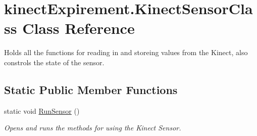 \hypertarget{classkinect_expirement_1_1_kinect_sensor_class}{}\section{kinect\+Expirement.\+Kinect\+Sensor\+Class Class Reference}
\label{classkinect_expirement_1_1_kinect_sensor_class}


Holds all the functions for reading in and storeing values from the Kinect, also constrols the state of the sensor.  


\subsection*{Static Public Member Functions}
\begin{DoxyCompactItemize}
\item 
static void \hyperlink{classkinect_expirement_1_1_kinect_sensor_class_aa8b994e7fba2d8a238f95bb6830ca4f3}{Run\+Sensor} ()
\begin{DoxyCompactList}\small\item\em Opens and runs the methods for using the Kinect Sensor. \end{DoxyCompactList}\end{DoxyCompactItemize}
